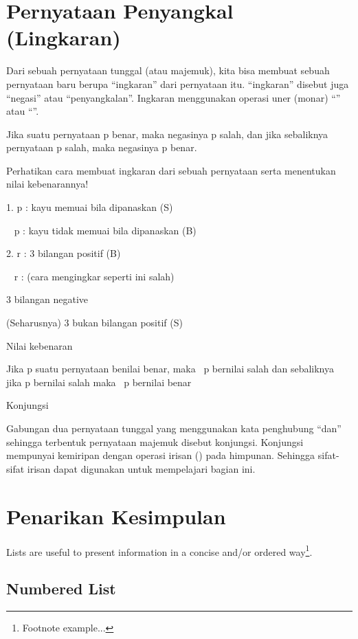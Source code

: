 \documentclass[11pt,fleqn]{book} %
\begin{document}

\section{Pernyataan Penyangkal (Lingkaran)}

Dari sebuah pernyataan tunggal (atau majemuk), kita bisa membuat sebuah pernyataan baru berupa “ingkaran” dari pernyataan itu. “ingkaran” disebut juga “negasi” atau “penyangkalan”. Ingkaran menggunakan operasi uner (monar) “” atau “”.

Jika suatu pernyataan p benar, maka negasinya p salah, dan jika sebaliknya pernyataan p salah, maka negasinya p benar.

Perhatikan cara membuat ingkaran dari sebuah pernyataan serta menentukan nilai kebenarannya!

1. p         : kayu memuai bila dipanaskan (S)

~ p      : kayu tidak memuai bila dipanaskan (B)

2.  r          : 3 bilangan positif (B)

~ r        : (cara mengingkar seperti ini salah)

3 bilangan negative

(Seharusnya) 3 bukan bilangan positif  (S)

Nilai kebenaran

Jika p suatu pernyataan benilai benar, maka  ~p bernilai salah dan sebaliknya jika p bernilai salah maka ~p bernilai benar

Konjungsi 

Gabungan  dua  pernyataan  tunggal  yang  menggunakan  kata penghubung  “dan”  sehingga  terbentuk  pernyataan majemuk  disebut konjungsi. Konjungsi mempunyai kemiripan dengan operasi irisan () pada  himpunan.  Sehingga  sifat-sifat  irisan  dapat  digunakan  untuk mempelajari  bagian  ini.




\section{Penarikan Kesimpulan}

Lists are useful to present information in a concise and/or ordered way\footnote{Footnote example...}.

\subsection{Numbered List}
\end{document}
